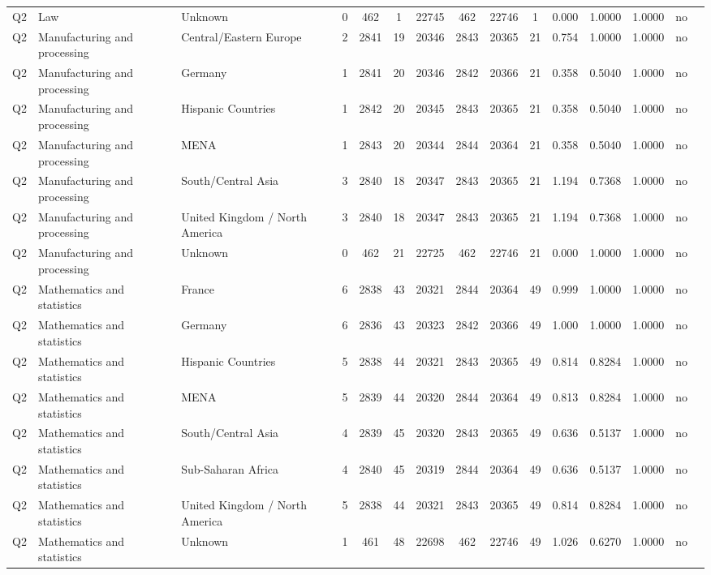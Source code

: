 \begin{longtable}{lllrcccccccccll}
Q2 & Law & Unknown & 0 & 462 & 1 & 22745 & 462 & 22746 & 1 & 0.000 & 1.0000 & 1.0000 & no \\
Q2 & Manufacturing and processing & Central/Eastern Europe & 2 & 2841 & 19 & 20346 & 2843 & 20365 & 21 & 0.754 & 1.0000 & 1.0000 & no \\
Q2 & Manufacturing and processing & Germany & 1 & 2841 & 20 & 20346 & 2842 & 20366 & 21 & 0.358 & 0.5040 & 1.0000 & no \\
Q2 & Manufacturing and processing & Hispanic Countries & 1 & 2842 & 20 & 20345 & 2843 & 20365 & 21 & 0.358 & 0.5040 & 1.0000 & no \\
Q2 & Manufacturing and processing & MENA & 1 & 2843 & 20 & 20344 & 2844 & 20364 & 21 & 0.358 & 0.5040 & 1.0000 & no \\
Q2 & Manufacturing and processing & South/Central Asia & 3 & 2840 & 18 & 20347 & 2843 & 20365 & 21 & 1.194 & 0.7368 & 1.0000 & no \\
Q2 & Manufacturing and processing & United Kingdom / North America & 3 & 2840 & 18 & 20347 & 2843 & 20365 & 21 & 1.194 & 0.7368 & 1.0000 & no \\
Q2 & Manufacturing and processing & Unknown & 0 & 462 & 21 & 22725 & 462 & 22746 & 21 & 0.000 & 1.0000 & 1.0000 & no \\
Q2 & Mathematics and statistics & France & 6 & 2838 & 43 & 20321 & 2844 & 20364 & 49 & 0.999 & 1.0000 & 1.0000 & no \\
Q2 & Mathematics and statistics & Germany & 6 & 2836 & 43 & 20323 & 2842 & 20366 & 49 & 1.000 & 1.0000 & 1.0000 & no \\
Q2 & Mathematics and statistics & Hispanic Countries & 5 & 2838 & 44 & 20321 & 2843 & 20365 & 49 & 0.814 & 0.8284 & 1.0000 & no \\
Q2 & Mathematics and statistics & MENA & 5 & 2839 & 44 & 20320 & 2844 & 20364 & 49 & 0.813 & 0.8284 & 1.0000 & no \\
Q2 & Mathematics and statistics & South/Central Asia & 4 & 2839 & 45 & 20320 & 2843 & 20365 & 49 & 0.636 & 0.5137 & 1.0000 & no \\
Q2 & Mathematics and statistics & Sub-Saharan Africa & 4 & 2840 & 45 & 20319 & 2844 & 20364 & 49 & 0.636 & 0.5137 & 1.0000 & no \\
Q2 & Mathematics and statistics & United Kingdom / North America & 5 & 2838 & 44 & 20321 & 2843 & 20365 & 49 & 0.814 & 0.8284 & 1.0000 & no \\
Q2 & Mathematics and statistics & Unknown & 1 & 461 & 48 & 22698 & 462 & 22746 & 49 & 1.026 & 0.6270 & 1.0000 & no \\

\end{longtable}

